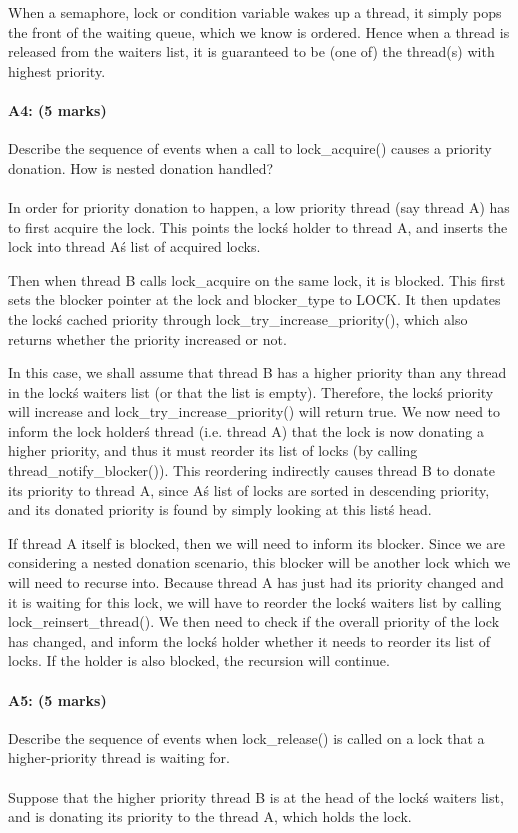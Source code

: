 When a semaphore, lock or condition variable wakes up a thread, it simply pops the front of the waiting queue, which we know is ordered. Hence when a thread is released from the waiters list, it is guaranteed to be (one of) the thread(s) with highest priority.

\paragraph{A4: (5 marks)}
Describe the sequence of events when a call to lock\_acquire() causes a priority donation.  How is nested donation handled?
\\
\\
In order for priority donation to happen, a low priority thread (say thread A) has to first acquire the lock. This points the lock\'s holder to thread A, and inserts the lock into thread A\'s list of acquired locks.

Then when thread B calls lock\_acquire on the same lock, it is blocked. This first sets the blocker pointer at the lock and blocker\_type to LOCK. It then updates the lock\'s cached priority through lock\_try\_increase\_priority(), which also returns whether the priority increased or not.

In this case, we shall assume that thread B has a higher priority than any thread in the lock\'s waiters list (or that the list is empty). Therefore, the lock\'s priority will increase and lock\_try\_increase\_priority() will return true. We now need to inform the lock holder\'s thread (i.e. thread A) that the lock is now donating a higher priority, and thus it must reorder its list of locks (by calling thread\_notify\_blocker()). This reordering indirectly causes thread B to donate its priority to thread A, since A\'s list of locks are sorted in descending priority, and its donated priority is found by simply looking at this list\'s head.

If thread A itself is blocked, then we will need to inform its blocker. Since we are considering a nested donation scenario, this blocker will be another lock which we will need to recurse into. Because thread A has just had its priority changed and it is waiting for this lock, we will have to reorder the lock\'s waiters list by calling lock\_reinsert\_thread(). We then need to check if the overall priority of the lock has changed, and inform the lock\'s holder whether it needs to reorder its list of locks. If the holder is also blocked, the recursion will continue.

\paragraph{A5: (5 marks)}
Describe the sequence of events when lock\_release() is called on a lock that a higher-priority thread is waiting for.
\\
\\
Suppose that the higher priority thread B is at the head of the lock\'s waiters list, and is donating its priority to the thread A, which holds the lock.

